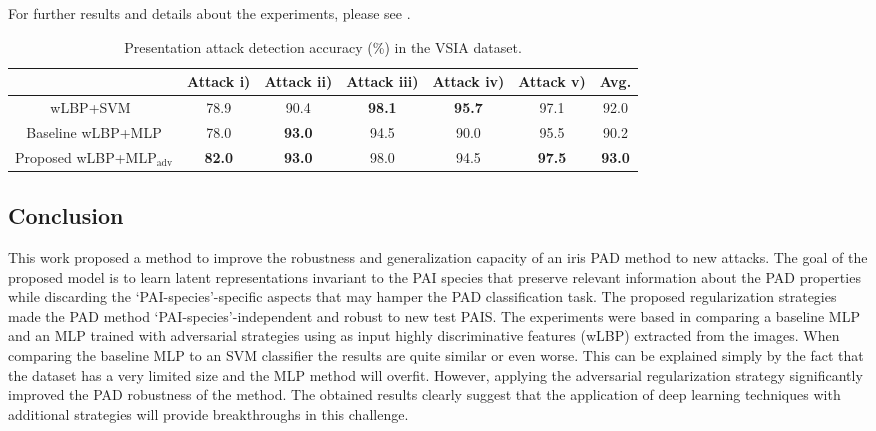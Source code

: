 For further results and details about the experiments, please see \citet{AdvInvAttack}.

\begin{table}[t]
    \centering
    \begin{small}
        \begin{tabular}{c|c c c c c:c}
            & Attack i)
            & Attack ii)
            & Attack iii)
            & Attack iv)
            & Attack v)
            & Avg. \\ \hline

            wLBP+SVM~\cite{sequeira2016realistic}
            &78.9     &90.4     &\bf 98.1 &\bf 95.7 & 97.1     & 92.0 \\
            Baseline wLBP+MLP
            &78.0     &\bf 93.0  &94.5    &90.0   &95.5     &90.2 \\
            Proposed wLBP+$\text{MLP}_\text{adv}$
            &\bf82.0  &\bf 93.0  &98.0   &94.5   &\bf 97.5  &\bf 93.0
        \end{tabular}
    \end{small}
    \caption{Presentation attack detection accuracy (\%) in the VSIA dataset.}
    \label{tab:pad_accuracy}
\end{table}

\subsection{Conclusion}
\label{sec:adv_iris_attack_conclusion}
This work proposed a method to improve the robustness and generalization capacity of an iris PAD method to new attacks. The goal of the proposed model is to learn latent representations invariant to the PAI species that preserve relevant information about the PAD properties while discarding the `PAI-species'-specific aspects that may hamper the PAD classification task. The proposed regularization strategies made the PAD method `PAI-species'-independent and robust to new test PAIS.
The experiments were based in comparing a baseline MLP and an MLP trained with adversarial strategies using as input highly discriminative features (wLBP) extracted from the images. When comparing the baseline MLP to an SVM classifier the results are quite similar or even worse. This can be explained simply by the fact that the dataset has a very limited size and the MLP method will overfit.
However, applying the adversarial regularization strategy significantly improved the PAD robustness of the method. The obtained results clearly suggest that the application of deep learning techniques with additional strategies will provide breakthroughs in this challenge.

